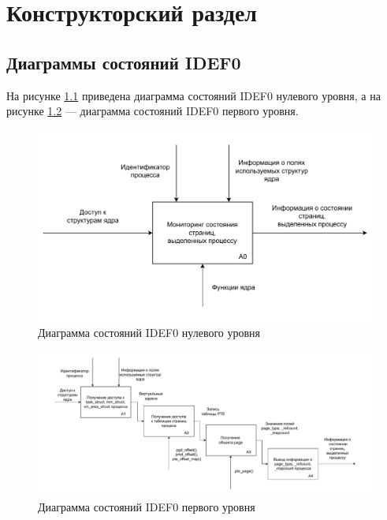 \chapter{Конструкторский раздел}

\section{Диаграммы состояний IDEF0}

На рисунке \ref{img:idef0} приведена диаграмма состояний IDEF0 нулевого уровня, а на рисунке \ref{img:idef1} --- диаграмма состояний IDEF0 первого уровня.

\begin{figure}[H]
	\begin{center}
		\includegraphics[scale=0.8]{inc/img/idef0.pdf}
	\end{center}
	\captionsetup{justification=centering}
	\caption{Диаграмма состояний IDEF0 нулевого уровня}
	\label{img:idef0}
\end{figure}

\begin{figure}[H]
	\begin{center}
		\includegraphics[scale=0.5]{inc/img/idef1.pdf}
	\end{center}
	\captionsetup{justification=centering}
	\caption{Диаграмма состояний IDEF0 первого уровня}
	\label{img:idef1}
\end{figure}

